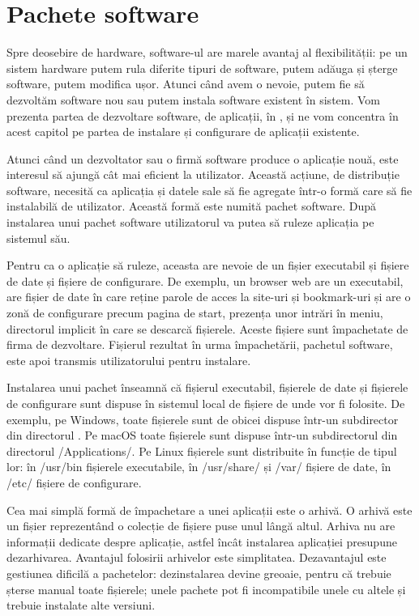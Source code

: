 \chapter{Pachete software}
\label{chapter:package}

Spre deosebire de hardware, software-ul are marele avantaj al flexibilității: pe un sistem hardware putem rula diferite tipuri de software, putem adăuga și șterge software, putem modifica ușor. Atunci când avem o nevoie, putem fie să dezvoltăm software nou sau putem instala software existent în sistem. Vom prezenta partea de dezvoltare software, de aplicații, în , și ne vom concentra în acest capitol pe partea de instalare și configurare de aplicații existente.

Atunci când un dezvoltator sau o firmă software produce o aplicație nouă, este interesul să ajungă cât mai eficient la utilizator. Această acțiune, de distribuție software, necesită ca aplicația și datele sale să fie agregate într-o formă care să fie instalabilă de utilizator. Această formă este numită pachet software. După instalarea unui pachet software utilizatorul va putea să ruleze aplicația pe sistemul său.

Pentru ca o aplicație să ruleze, aceasta are nevoie de un fișier executabil și fișiere de date și fișiere de configurare. De exemplu, un browser web are un executabil, are fișier de date în care reține parole de acces la site-uri și bookmark-uri și are o zonă de configurare precum pagina de start, prezența unor intrări în meniu, directorul implicit în care se descarcă fișierele. Aceste fișiere sunt împachetate de firma de dezvoltare. Fișierul rezultat în urma împachetării, pachetul software, este apoi transmis utilizatorului pentru instalare. 

Instalarea unui pachet înseamnă că fișierul executabil, fișierele de date și fișierele de configurare sunt dispuse în sistemul local de fișiere de unde vor fi folosite. De exemplu, pe Windows, toate fișierele sunt de obicei dispuse într-un subdirector din directorul . Pe macOS toate fișierele sunt dispuse într-un subdirectorul din directorul /Applications/. Pe Linux fișierele sunt distribuite în funcție de tipul lor: în /usr/bin fișierele executabile, în /usr/share/ și /var/ fișiere de date, în /etc/ fișiere de configurare.

Cea mai simplă formă de împachetare a unei aplicații este o arhivă. O arhivă este un fișier reprezentând o colecție de fișiere puse unul lângă altul. Arhiva nu are informații dedicate despre aplicație, astfel încât instalarea aplicației presupune dezarhivarea. Avantajul folosirii arhivelor este simplitatea. Dezavantajul este gestiunea dificilă a pachetelor: dezinstalarea devine greoaie, pentru că trebuie șterse manual toate fișierele; unele pachete pot fi incompatibile unele cu altele și trebuie instalate alte versiuni.

